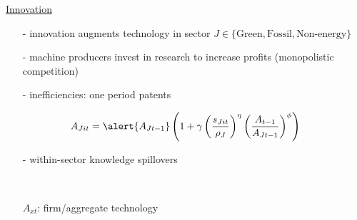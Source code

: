 \documentclass[11pt,aspectratio=169]{beamer}
\begin{document}
		
\begin{frame}{\hyperlink{modma}{Innovation}}
	\hypertarget{backinnov}{}
	\vspace{-2mm}
	\begin{itemize}
		\item[-] innovation augments technology in sector $J\in\{\text{Green},\text{Fossil},\text{Non-energy}\}$ \vspace{-1mm}
		\item[-] machine producers invest in research to increase profits \small{(monopolistic competition)}
		\vspace{-1mm}
		\normalsize
		\item[-] inefficiencies: one period patents
	\end{itemize}
	\vspace{-2.5mm}
	\large
	\begin{align*}
		A_{Jit}=\alert{A_{Jt-1}}\left(1+\gamma\left(\frac{s_{Jit}}{\rho_J}\right)^\eta\left(\frac{A_{t-1}}{A_{Jt-1}}\right)^\phi\right)
	\end{align*}
	\normalsize
	\vspace{-1.4mm}
	\begin{enumerate}
		\item[-] \alert{within-sector knowledge spillovers} %
		\item[] \  %
	\end{enumerate}
	\small
\vspace{4mm}
\hspace{-2mm}
\begin{minipage}[t!]{0.43\textwidth}
	\vspace{0mm}
	\begin{itemize}
		\item[] $A_{xt}$: firm/aggregate technology

\end{itemize}
\end{minipage}
\end{frame}
\end{document}
